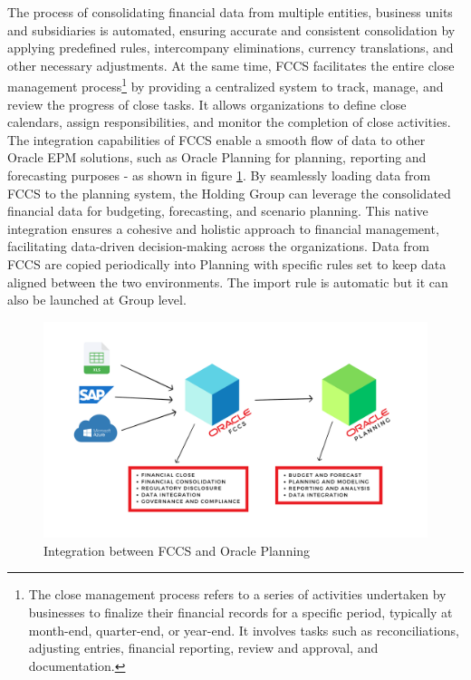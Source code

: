 \documentclass[12pt,a4paper,openright,twoside]{book}
\begin{document}
The process of consolidating financial data from multiple entities, business units and subsidiaries is automated, ensuring accurate and consistent consolidation by applying predefined rules, intercompany eliminations, currency translations, and other necessary adjustments.
%
At the same time, FCCS facilitates the entire close management process\footnote{The close management process refers to a series of activities undertaken by businesses to finalize their financial records for a specific period, typically at month-end, quarter-end, or year-end. It involves tasks such as reconciliations, adjusting entries, financial reporting, review and approval, and documentation.} by providing a centralized system to track, manage, and review the progress of close tasks. 
%
It allows organizations to define close calendars, assign responsibilities, and monitor the completion of close activities.
%
The integration capabilities of FCCS enable a smooth flow of data to other Oracle EPM solutions, such as Oracle Planning for planning, reporting and forecasting purposes - as shown in figure \ref{fig:planning-fccs}.
%
By seamlessly loading data from FCCS to the planning system, the Holding Group can leverage the consolidated financial data for budgeting, forecasting, and scenario planning. 
%
This native integration ensures a cohesive and holistic approach to financial management, facilitating data-driven decision-making across the organizations.
%
Data from FCCS are copied periodically into Planning with specific rules set to keep data aligned between the two environments.
%
The import rule is automatic but it can also be launched at Group level. 

\begin{figure}[htbp]
	\centering
	\includegraphics[width=\linewidth]{figures/planning-fccs.pdf}
	\caption{Integration between FCCS and Oracle Planning}
	\label{fig:planning-fccs}
\end{figure}
\end{document}
